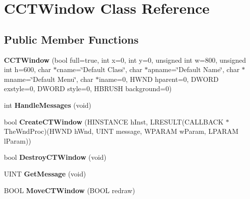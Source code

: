 \hypertarget{class_c_c_t_window}{
\section{CCTWindow Class Reference}
\label{class_c_c_t_window}
}
\subsection*{Public Member Functions}
\begin{DoxyCompactItemize}
\item 
\hypertarget{class_c_c_t_window_acaf4fb95a8715e5c6092f2c68d6177f4}{
{\bfseries CCTWindow} (bool full=true, int x=0, int y=0, unsigned int w=800, unsigned int h=600, char $\ast$cname=\char`\"{}Default Class\char`\"{}, char $\ast$apname=\char`\"{}Default Name\char`\"{}, char $\ast$mname=\char`\"{}Default Menu\char`\"{}, char $\ast$iname=0, HWND hparent=0, DWORD exstyle=0, DWORD style=0, HBRUSH background=0)}
\label{class_c_c_t_window_acaf4fb95a8715e5c6092f2c68d6177f4}

\item 
\hypertarget{class_c_c_t_window_a9693d37eaf679800702065f3cdc875dd}{
int {\bfseries HandleMessages} (void)}
\label{class_c_c_t_window_a9693d37eaf679800702065f3cdc875dd}

\item 
\hypertarget{class_c_c_t_window_a18d1c7435eb4b0594ac17b378d75d5f4}{
bool {\bfseries CreateCTWindow} (HINSTANCE hInst, LRESULT(CALLBACK $\ast$TheWndProc)(HWND hWnd, UINT message, WPARAM wParam, LPARAM lParam))}
\label{class_c_c_t_window_a18d1c7435eb4b0594ac17b378d75d5f4}

\item 
\hypertarget{class_c_c_t_window_a0b41b05f6176cd357cfb3282dbb203dc}{
bool {\bfseries DestroyCTWindow} (void)}
\label{class_c_c_t_window_a0b41b05f6176cd357cfb3282dbb203dc}

\item 
\hypertarget{class_c_c_t_window_a149c86a7c9456e3b6f18d313d8a8891b}{
UINT {\bfseries GetMessage} (void)}
\label{class_c_c_t_window_a149c86a7c9456e3b6f18d313d8a8891b}

\item 
\hypertarget{class_c_c_t_window_a1fa322f15401a0907baa0203faaa7a96}{
BOOL {\bfseries MoveCTWindow} (BOOL redraw)}
\label{class_c_c_t_window_a1fa322f15401a0907baa0203faaa7a96}

\end{DoxyCompactItemize}
